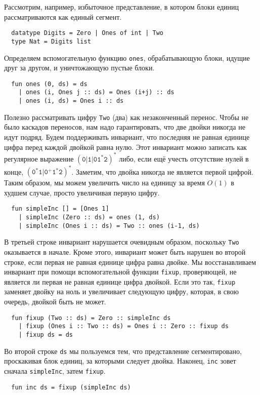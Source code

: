 Рассмотрим, например, избыточное представление, в котором блоки единиц
рассматриваются как единый сегмент.
\begin{lstlisting}
  datatype Digits = Zero | Ones of int | Two
  type Nat = Digits list
\end{lstlisting}
Определяем вспомогательную функцию \lstinline!ones!, обрабатывающую
блоки, идущие друг за другом, и уничтожающую пустые блоки.
\begin{lstlisting}
  fun ones (0, ds) = ds
    | ones (i, Ones j :: ds) = Ones (i+j) :: ds
    | ones (i, ds) = Ones i :: ds
\end{lstlisting}
Полезно рассматривать цифру \lstinline!Two! (два) как незаконченный
перенос. Чтобы не было каскадов переносов, нам надо гарантировать, что
две двойки никогда не идут подряд. Будем поддерживать инвариант, что
последняя не равная единице цифра перед каждой двойкой равна
нулю. Этот инвариант можно записать как регулярное выражение
$\mathtt{(0|1|01^*2)^*}$ либо, если ещё учесть отсутствие нулей в
конце, $\mathtt{(0^*1 | 0^+1^*2)^*}$. Заметим, что двойка никогда не
является первой цифрой. Таким образом, мы можем увеличить число на
единицу за время $O(1)$ в худшем случае, просто увеличивая первую
цифру.
\begin{lstlisting}
  fun simpleInc [] = [Ones 1]
    | simpleInc (Zero :: ds) = ones (1, ds)
    | simpleInc (Ones i :: ds) = Two :: ones (i-1, ds)
\end{lstlisting}
В третьей строке инвариант нарушается очевидным образом, поскольку
\lstinline!Two! оказывается в начале. Кроме этого, инвариант может
быть нарушен во второй строке, если первая не равная единице цифра
равна двойке. Мы восстанавливаем инвариант при помощи вспомогательной
функции \lstinline!fixup!, проверяющей, не является ли первая не
равная единице цифра двойкой. Если это так, \lstinline!fixup! заменяет
двойку на ноль и увеличивает следующую цифру, которая, в свою очередь,
двойкой быть не может.
\begin{lstlisting}
  fun fixup (Two :: ds) = Zero :: simpleInc ds
    | fixup (Ones i :: Two :: ds) = Ones i :: Zero :: fixup ds
    | fixup ds = ds
\end{lstlisting}
Во второй строке \lstinline!ds! мы пользуемся тем, что представление
сегментировано, проскакивая блок единиц, за которыми следует
двойка. Наконец, \lstinline!inc! зовет сначала \lstinline!simpleInc!,
затем \lstinline!fixup!.
\begin{lstlisting}
  fun inc ds = fixup (simpleInc ds)
\end{lstlisting}

